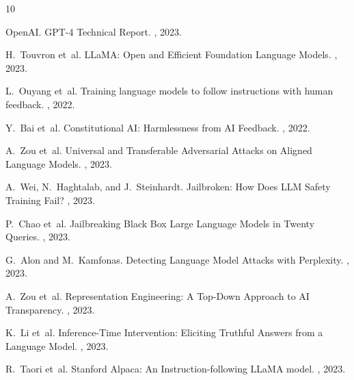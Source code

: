 \documentclass[10pt,twocolumn]{article}
\begin{document}

\begin{thebibliography}{10}

OpenAI.
\newblock GPT-4 Technical Report.
, 2023.

H.~Touvron et~al.
\newblock LLaMA: Open and Efficient Foundation Language Models.
, 2023.

L.~Ouyang et~al.
\newblock Training language models to follow instructions with human feedback.
, 2022.

Y.~Bai et~al.
\newblock Constitutional AI: Harmlessness from AI Feedback.
, 2022.

A.~Zou et~al.
\newblock Universal and Transferable Adversarial Attacks on Aligned Language Models.
, 2023.

A.~Wei, N.~Haghtalab, and J.~Steinhardt.
\newblock Jailbroken: How Does LLM Safety Training Fail?
, 2023.

P.~Chao et~al.
\newblock Jailbreaking Black Box Large Language Models in Twenty Queries.
, 2023.

G.~Alon and M.~Kamfonas.
\newblock Detecting Language Model Attacks with Perplexity.
, 2023.

A.~Zou et~al.
\newblock Representation Engineering: A Top-Down Approach to AI Transparency.
, 2023.

K.~Li et~al.
\newblock Inference-Time Intervention: Eliciting Truthful Answers from a Language Model.
, 2023.

R.~Taori et~al.
\newblock Stanford Alpaca: An Instruction-following LLaMA model.
, 2023.

\end{thebibliography}
\end{document}
